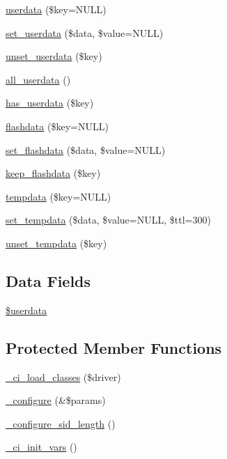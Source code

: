 \begin{DoxyCompactItemize}
\mbox{\hyperlink{class_c_i___session_ab10006d10762845f93392ef4c2884df6}{userdata}} (\$key=N\+U\+LL)
\item 
\mbox{\hyperlink{class_c_i___session_a17de7d10cbbe8162d16bfc43083e74aa}{set\+\_\+userdata}} (\$data, \$value=N\+U\+LL)
\item 
\mbox{\hyperlink{class_c_i___session_a8d3a4935d2ff2088f11654445d9a0122}{unset\+\_\+userdata}} (\$key)
\item 
\mbox{\hyperlink{class_c_i___session_a974fa60ddc074b14ffcc78ef9902bc5c}{all\+\_\+userdata}} ()
\item 
\mbox{\hyperlink{class_c_i___session_a25f39652bb0f716817e5e1e778729bea}{has\+\_\+userdata}} (\$key)
\item 
\mbox{\hyperlink{class_c_i___session_acc27ddf9dd242d2c887eca2504136cff}{flashdata}} (\$key=N\+U\+LL)
\item 
\mbox{\hyperlink{class_c_i___session_a177029809f00f95b6a83cc137a45ff4e}{set\+\_\+flashdata}} (\$data, \$value=N\+U\+LL)
\item 
\mbox{\hyperlink{class_c_i___session_a1e25514ba8dbd132db06cbedc6412158}{keep\+\_\+flashdata}} (\$key)
\item 
\mbox{\hyperlink{class_c_i___session_a0bd79cb5948499f7c43adbe29f0c24a9}{tempdata}} (\$key=N\+U\+LL)
\item 
\mbox{\hyperlink{class_c_i___session_a51cac8d017a43882b365aa45745dc892}{set\+\_\+tempdata}} (\$data, \$value=N\+U\+LL, \$ttl=300)
\item 
\mbox{\hyperlink{class_c_i___session_a79d3115c19f6dfa873ca5f3a7929f24a}{unset\+\_\+tempdata}} (\$key)
\end{DoxyCompactItemize}
\subsection*{Data Fields}
\begin{DoxyCompactItemize}
\item 
\mbox{\hyperlink{class_c_i___session_af70e594e86a310311c717b13e6ecac00}{\$userdata}}
\end{DoxyCompactItemize}
\subsection*{Protected Member Functions}
\begin{DoxyCompactItemize}
\item 
\mbox{\hyperlink{class_c_i___session_ae4203f92a9f8a01d2498649f79acb0f9}{\+\_\+ci\+\_\+load\+\_\+classes}} (\$driver)
\item 
\mbox{\hyperlink{class_c_i___session_a71e7f49b0627505b4a7dbc8ce368279b}{\+\_\+configure}} (\&\$params)
\item 
\mbox{\hyperlink{class_c_i___session_af85033c81c047ceeec26aa087d5ba459}{\+\_\+configure\+\_\+sid\+\_\+length}} ()
\item 
\mbox{\hyperlink{class_c_i___session_a143bee24c36e5fd566b58bed89cd8463}{\+\_\+ci\+\_\+init\+\_\+vars}} ()
\end{DoxyCompactItemize}
